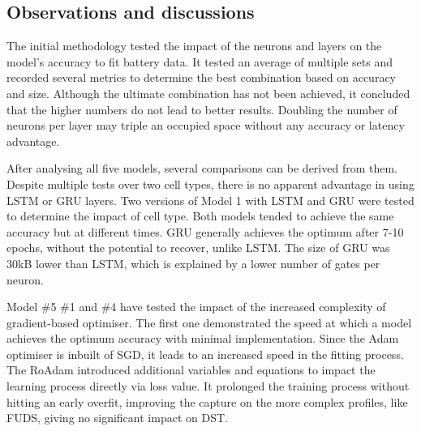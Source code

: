 %
%
\subsection{Observations and discussions}
%
%
The initial methodology tested the impact of the neurons and layers on the model's accuracy to fit battery data.
It tested an average of multiple sets and recorded several metrics to determine the best combination based on accuracy and size.
Although the ultimate combination has not been achieved, it concluded that the higher numbers do not lead to better results.
Doubling the number of neurons per layer may triple an occupied space without any accuracy or latency advantage.

%
%
After analysing all five models, several comparisons can be derived from them.
Despite multiple tests over two cell types, there is no apparent advantage in using LSTM or GRU layers.
Two versions of Model 1 with LSTM and GRU were tested to determine the impact of cell type.
Both models tended to achieve the same accuracy but at different times.
GRU generally achieves the optimum after 7-10 epochs, without the potential to recover, unlike LSTM. %
The size of GRU was 30kB lower than LSTM, which is explained by a lower number of gates per neuron.

%

%
%
Model \#5 \#1 and \#4 have tested the impact of the increased complexity of gradient-based optimiser.
The first one demonstrated the speed at which a model achieves the optimum accuracy with minimal implementation.
Since the Adam optimiser is inbuilt of SGD, it leads to an increased speed in the fitting process.
The RoAdam introduced additional variables and equations to impact the learning process directly via loss value.
It prolonged the training process without hitting an early overfit, improving the capture on the more complex profiles, like FUDS, giving no significant impact on DST. 

